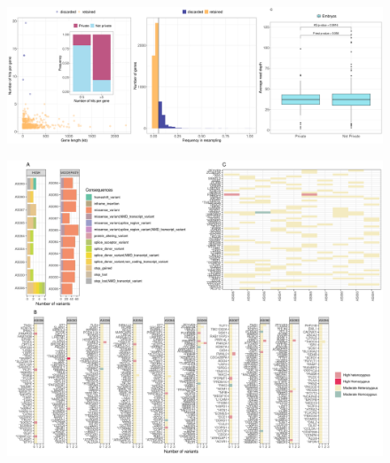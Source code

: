 \begin{figure}[ht]
\centering
\includegraphics[width=\linewidth]{fig/filters_embryos.png}
\caption{\textbf{}}
\label{fig:filters}
\end{figure}

\begin{figure}[ht]
\centering
\includegraphics[width=\linewidth]{fig/panel_EmbryoResults.png}
\caption{\textbf{}}
\label{fig:resembryo}
\end{figure}

